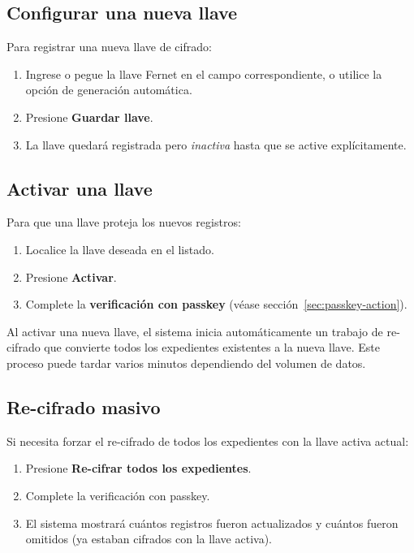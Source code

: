 \documentclass[11pt,twoside]{article}
\begin{document}
\subsection{Configurar una nueva llave}

Para registrar una nueva llave de cifrado:

\begin{enumerate}[leftmargin=2em]
  \item Ingrese o pegue la llave Fernet en el campo correspondiente, o
    utilice la opción de generación automática.
  \item Presione \textbf{Guardar llave}.
  \item La llave quedará registrada pero \textit{inactiva} hasta que se
    active explícitamente.
\end{enumerate}

\subsection{Activar una llave}

Para que una llave proteja los nuevos registros:

\begin{enumerate}[leftmargin=2em]
  \item Localice la llave deseada en el listado.
  \item Presione \textbf{Activar}.
  \item Complete la \textbf{verificación con passkey}
    (véase sección~\ref{sec:passkey-action}).
\end{enumerate}

\begin{nota}
Al activar una nueva llave, el sistema inicia automáticamente un trabajo de
re-cifrado que convierte todos los expedientes existentes a la nueva llave.
Este proceso puede tardar varios minutos dependiendo del volumen de datos.
\end{nota}

\subsection{Re-cifrado masivo}

Si necesita forzar el re-cifrado de todos los expedientes con la llave
activa actual:

\begin{enumerate}[leftmargin=2em]
  \item Presione \textbf{Re-cifrar todos los expedientes}.
  \item Complete la verificación con passkey.
  \item El sistema mostrará cuántos registros fueron actualizados y cuántos
    fueron omitidos (ya estaban cifrados con la llave activa).
\end{enumerate}
\end{document}
